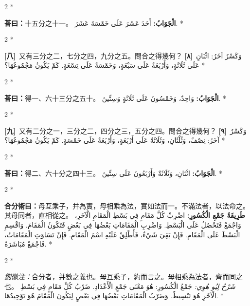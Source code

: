 \documentclass[11pt,a4paper]{article}
\newcommand{\ar}[1]{\arabicfont\beginR #1\endR}
\newcommand{\problemnum}[1]{\textbf{[\ignorespaces#1\unskip]}}
\newenvironment{bilingual}{%
  \begin{paracol}{2}%
  \switchcolumn[0]*%
}{%
  \end{paracol}%
}
\newcommand{\cnline}[1]{\switchcolumn[0]\noindent #1 \switchcolumn[1]}
\newcommand{\arline}[1]{\noindent\ar{#1} \switchcolumn[0]*}
\newenvironment{prob bilingual}{%
  \begin{paracol}{2}%
  \switchcolumn[0]*%
}{%
  \end{paracol}%
  \vspace{0.3em}%
}
\begin{document}
\begin{bilingual}
\cnline{\textcolor{answercolor}{\textbf{荅曰：}}十五分之十一。}
\arline{\textcolor{answercolor}{\textbf{الْجَوَابُ:}} أَحَدَ عَشَرَ عَلَى خَمْسَةَ عَشَرَ.}
\end{bilingual}

\begin{bilingual}
\cnline{\problemnum{八}\, 又有三分之二，七分之四，九分之五。問合之得幾何？}
\arline{\problemnum{٨}\, وَكَسْرٌ آخَرُ: اثْنَانِ عَلَى ثَلَاثَةٍ، وَأَرْبَعَةٌ عَلَى سَبْعَةٍ، وَخَمْسَةٌ عَلَى تِسْعَةٍ. كَمْ يَكُونُ مَجْمُوعُهَا؟}
\end{bilingual}

\begin{bilingual}
\cnline{\textcolor{answercolor}{\textbf{荅曰：}}得一、六十三分之五十。}
\arline{\textcolor{answercolor}{\textbf{الْجَوَابُ:}} وَاحِدٌ، وَخَمْسُونَ عَلَى ثَلَاثَةٍ وَسِتِّينَ.}
\end{bilingual}

\begin{bilingual}
\cnline{\problemnum{九}\, 又有二分之一，三分之二，四分之三，五分之四。問合之得幾何？}
\arline{\problemnum{٩}\, وَكَسْرٌ آخَرُ: نِصْفٌ، وَثُلْثَانِ، وَثَلَاثَةٌ عَلَى أَرْبَعَةٍ، وَأَرْبَعَةٌ عَلَى خَمْسَةٍ. كَمْ يَكُونُ مَجْمُوعُهَا؟}
\end{bilingual}

\begin{bilingual}
\cnline{\textcolor{answercolor}{\textbf{荅曰：}}得二、六十分之四十三。}
\arline{\textcolor{answercolor}{\textbf{الْجَوَابُ:}} اثْنَانِ، وَثَلَاثَةٌ وَأَرْبَعُونَ عَلَى سِتِّينَ.}
\end{bilingual}

\begin{bilingual}
\cnline{%
\textcolor{methodcolor}{\textbf{合分術曰：}}母互乘子，并為實，母相乘為法，實如法而一。不滿法者，以法命之。其母同者，直相從之。
}
\arline{%
\textcolor{methodcolor}{\textbf{طَرِيقَةُ جَمْعِ الْكُسُورِ:}} اضْرِبْ كُلَّ مَقَامٍ فِي بَسْطِ الْمَقَامِ الْآخَرِ، وَاجْمَعْ فَتَحْصُلُ عَلَى الْبَسْطِ. وَاضْرِبِ الْمَقَامَاتِ بَعْضُهَا فِي بَعْضٍ فَتَكُونُ الْمَقَامَ. وَاقْسِمِ الْبَسْطَ عَلَى الْمَقَامِ. فَإِنْ بَقِيَ شَيْءٌ، فَأَطْلِقْ عَلَيْهِ اسْمَ الْمَقَامِ. فَإِنْ تَسَاوَتِ الْمَقَامَاتُ، فَاجْمَعْ مُبَاشَرَةً.
}
\end{bilingual}

\begin{bilingual}
\cnline{%
\textcolor{commentarycolor}{\small\textit{劉徽注：}}合分者，并數之義也。母互乘子，約而言之。母相乘為法者，齊而同之也。
}
\arline{%
\textcolor{commentarycolor}{\small\textit{شَرْحُ لِيُو هُوِي:}} جَمْعُ الْكُسُورِ: هُوَ مَعْنَى جَمْعِ الْأَعْدَادِ. ضَرْبُ كُلِّ مَقَامٍ فِي بَسْطِ الْآخَرِ هُوَ تَبْسِيطٌ. وَضَرْبُ الْمَقَامَاتِ بَعْضُهَا فِي بَعْضٍ لِيَكُونَ الْمَقَامَ هُوَ تَوْحِيدُهَا.
}
\end{bilingual}
\end{document}

